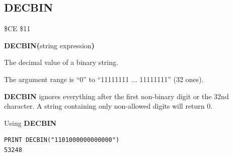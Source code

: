 \subsection{DECBIN}
\begin{description}[leftmargin=2cm,style=nextline]
\item [Token:]    \$CE \$11

\item [Format:]   {\bf DECBIN(}string expression{\bf)}

\item [Returns:]  The decimal value of a binary string.

                  The argument range is ``0'' to ``11111111 ... 11111111'' (32 ones).

\item [Remarks:]  {\bf DECBIN} ignores everything after the first non-binary digit or the 32nd character. A string containing only non-allowed digits will return 0.

\item [Example:]  Using {\bf DECBIN}

\begin{tcolorbox}[colback=black,coltext=white]
\verbatimfont{\codefont}
\begin{verbatim}
PRINT DECBIN("1101000000000000")
53248
\end{verbatim}
\end{tcolorbox}
\end{description}


\newpage

